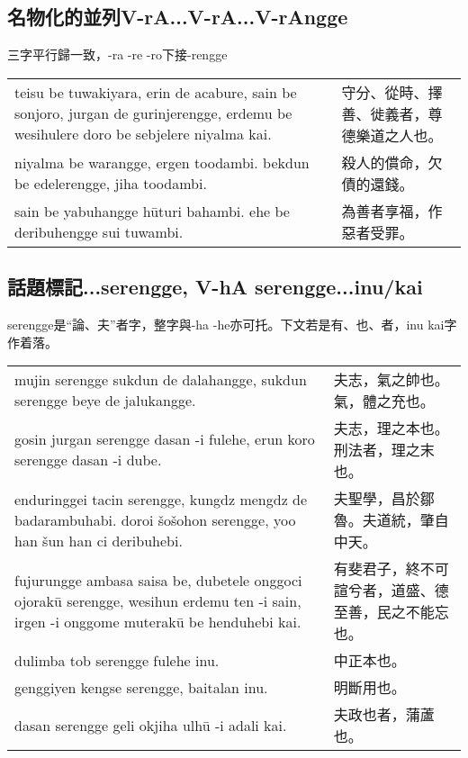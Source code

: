 \documentclass{article}
\begin{document}
\subsection{名物化的並列V-rA...V-rA...V-rAngge}
\noindent 三字平行歸一致，-ra -re -ro下接-rengge
\begin{center}
    \begin{tabularx}{\textwidth}{XX}
        teisu be tuwakiyara, erin de acabure, sain be sonjoro, jurgan de gurinjerengge, erdemu be wesihulere doro be sebjelere niyalma kai. & 守分、從時、擇善、徙義者，尊德樂道之人也。\\
        niyalma be warangge, ergen toodambi. bekdun be edelerengge, jiha toodambi. & 殺人的償命，欠債的還錢。\\
        sain be yabuhangge h\={u}turi bahambi. ehe be deribuhengge sui tuwambi. & 為善者享福，作惡者受罪。
    \end{tabularx}
\end{center}

\subsection{話題標記...serengge, V-hA serengge...inu/kai}
\noindent serengge是“論、夫”者字，整字與-ha -he亦可托。下文若是有、也、者，inu kai字作着落。
\begin{center}
    \begin{tabularx}{\textwidth}{XX}
        mujin serengge sukdun de dalahangge, sukdun serengge beye de jalukangge. & 夫志，氣之帥也。氣，體之充也。\\
        gosin jurgan serengge dasan -i fulehe, erun koro serengge dasan -i dube. & 夫志，理之本也。刑法者，理之末也。\\
        enduringgei tacin serengge, kungdz mengdz de badarambuhabi. doroi \v{s}o\v{s}ohon serengge, yoo han \v{s}un han ci deribuhebi. & 夫聖學，昌於鄒魯。夫道統，肇自中天。\\
        fujurungge ambasa saisa be, dubetele onggoci ojorak\={u} serengge, wesihun erdemu ten -i sain, irgen -i onggome muterak\={u} be henduhebi kai. & 有斐君子，終不可諠兮者，道盛、德至善，民之不能忘也。\\
        dulimba tob serengge fulehe inu. & 中正本也。\\
        genggiyen kengse serengge, baitalan inu. & 明斷用也。\\
        dasan serengge geli okjiha ulh\={u} -i adali kai. & 夫政也者，蒲蘆也。
    \end{tabularx}
\end{center}
\end{document}

